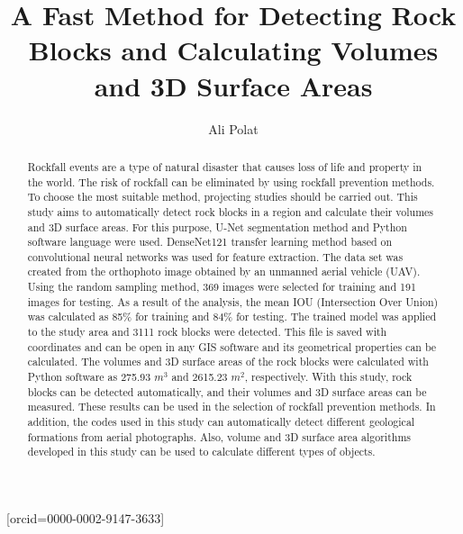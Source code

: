 \documentclass[a4paper,fleqn]{cas-sc}
\begin{document}
\let\WriteBookmarks\relax
\def\floatpagepagefraction{1}
\def\textpagefraction{.001}

\title [mode = title]{A Fast Method for Detecting Rock Blocks and Calculating Volumes and 3D Surface Areas}


\author[0]{Ali Polat}[orcid=0000-0002-9147-3633]




\address[0]{Provincial Directorate of Disaster and Emergency, 58000, Sivas, Turkey}


\begin{abstract}
Rockfall events are a type of natural disaster that causes loss of life and property in the world. The risk of rockfall can be eliminated by using rockfall prevention methods. To choose the most suitable method, projecting studies should be carried out. This study aims to automatically detect rock blocks in a region and calculate their volumes and 3D surface areas. For this purpose, U-Net segmentation method and Python software language were used. DenseNet121 transfer learning method based on convolutional neural networks was used for feature extraction. The data set was created from the orthophoto image obtained by an unmanned aerial vehicle (UAV). Using the random sampling method, 369 images were selected for training and 191 images for testing. As a result of the analysis, the mean IOU (Intersection Over Union) was calculated as 85\% for training and 84\% for testing. The trained model was applied to the study area and 3111 rock blocks were detected. This file is saved with coordinates and can be open in any GIS software and its geometrical properties can be calculated. The volumes and 3D surface areas of the rock blocks were calculated with Python software as 275.93 $m^3$ and 2615.23 $m^2$, respectively. With this study, rock blocks can be detected automatically, and their volumes and 3D surface areas can be measured. These results can be used in the selection of rockfall prevention methods. In addition, the codes used in this study can automatically detect different geological formations from aerial photographs. Also, volume and 3D surface area algorithms developed in this study can be used to calculate different types of objects.
\end{abstract}
 
\end{document}
